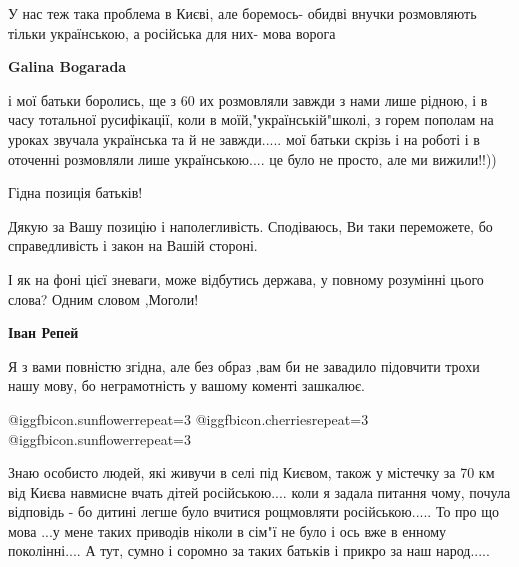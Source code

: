 \begin{itemize}

У нас теж така проблема в Києві, але боремось- обидві внучки розмовляють тільки
українською, а російська для них- мова ворога

\begin{itemize} %
\textbf{Galina Bogarada} 

і мої батьки боролись, ще з 60 их розмовляли завжди з нами лише рідною, і в часу
тотальної русифікації, коли в моїй,"українській"школі, з горем пополам на уроках
звучала українська та й не завжди..... мої батьки скрізь і на роботі і в
оточенні розмовляли лише українською.... це було не просто, але ми вижили!!))

\end{itemize} %

Гідна позиція батьків!


Дякую за
Вашу позицію і наполегливість.
Сподіваюсь,
Ви таки переможете, бо справедливість і закон на
Вашій стороні.

І як на фоні цієї зневаги, може відбутись держава, у повному розумінні цього слова? Одним словом ,Моголи!


\textbf{Іван Репей} 

Я з вами повністю згідна, але без образ ,вам би не завадило підовчити трохи нашу
мову, бо неграмотність у вашому коменті зашкалює.

 @igg{fbicon.sunflower}{repeat=3}  @igg{fbicon.cherries}{repeat=3}  @igg{fbicon.sunflower}{repeat=3} 


Знаю особисто людей, які живучи в селі під Києвом, також у містечку за 70 км від
Києва навмисне вчать дітей російською.... коли я задала питання чому, почула
відповідь - бо дитині легше було вчитися рощмовляти російською..... То про що
мова ...у мене таких приводів ніколи в сім"ї не було і ось вже в енному
поколінні.... А тут, сумно і соромно за таких батьків і прикро за наш народ.....




\end{itemize} %
